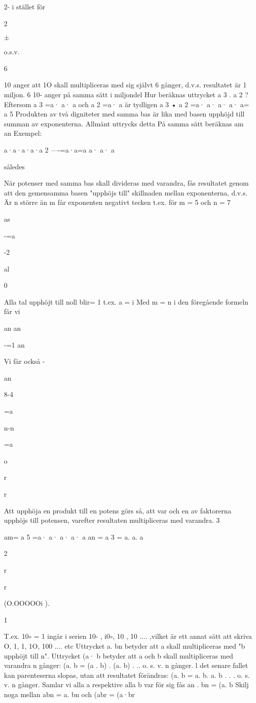 \documentclass[a4paper,twoside,twocolumn,openright]{book}
\begin{document}
{{{{{{2- i stället för

2~

$\pm$

o.s.v.

6

10 anger att 1O skall multipliceras med sig
självt 6 gånger, d.v.s. resultatet är 1 miljon.
6
10- anger på samma sätt i miljondel
Hur beräknas uttrycket a 3 . a 2 ?
Eftersom a 3 =a· a· a och a 2 =a· a
är tydligen a 3 • a 2 =a· a· a· a· a= a 5
Produkten av två digniteter med samma
bas är lika med basen upphöjd till summan av exponenterna.
Allmänt uttrycks detta
På samma sätt beräknas am
an
Exempel:

a·a·a·a·a
2
----=a·a=a
a· a· a

således

När potenser med samma bas skall divideras med varandra, fås resultatet genom att den gemensamma basen "upphöjs till" skillnaden mellan exponenterna,
d.v.s.
Är n större än m får exponenten negativt
tecken t.ex. för m = 5 och n = 7

as

-=a

-2

al

0

Alla tal upphöjt till noll blir= 1 t.ex. a = i
Med m = n i den föregående formeln får vi

an
an

-=1
an

Vi får också -

an

8-4

=a

n-n

=a

o

r

r

Att upphöja en produkt till en potens görs
så, att var och en av faktorerna upphöjs
till potensen, varefter resultaten multipliceras med varandra.
3

am= a 5 =a· a· a· a· a
an = a 3 = a. a. a

2

r

r

(O.OOOOOi ).

1

T.ex. 10$\circ$ = 1 ingår i serien 10- , i0$\circ$, 10 , 10
.... ,vilket är ett annat sätt att skriva O, 1, 1, 1O,
100 .... etc
Uttrycket a. bn betyder att a skall multipliceras med "b upphöjt till n".
Uttrycket (a· b betyder att a och b skall
multipliceras med varandra n gånger:
(a. b = (a . b) . (a. b) . .. o. s. v. n gånger.
l det senare fallet kan parenteserna slopas,
utan att resultatet förändras:
(a. b = a. b. a. b . . . o. s. v. n gånger.
Samlar vi alla a respektive alla b var för sig
fås an . bn = (a. b
Skilj noga mellan abn = a. bn
och
(abr = (a·br

}}}}}}
\end{document}
